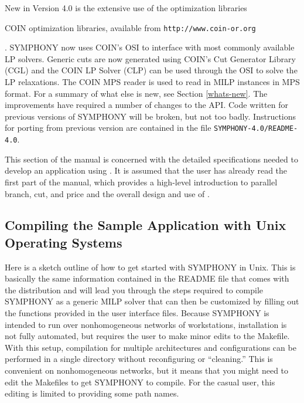 New in Version 4.0 is the extensive use of the
\emph{}
optimization libraries 
\begin{latexonly} 
COIN optimization libraries,
available from \texttt{http://www.coin-or.org} 
\end{latexonly}.
SYMPHONY now uses COIN's OSI to interface with most commonly available LP
solvers. Generic cuts are now generated using COIN's Cut Generator Library
(CGL) and the COIN LP Solver (CLP) can be used through the OSI to solve the LP
relaxations. The COIN MPS reader is used to read in MILP instances in MPS
format. For a summary of what else is new, see Section \ref{whats-new}. The
improvements have required a number of changes to the API. Code written for
previous versions of SYMPHONY will be broken, but not too badly. Instructions
for porting from previous version are contained in the file
\texttt{SYMPHONY-4.0/README-4.0}.

This section of the manual is concerned with the detailed
specifications needed to develop an application using \BB. It is
assumed that the user has already read the first part of the manual, which
provides a high-level introduction to parallel branch, cut, and price
and the overall design and use of \BB. 


\subsection{Compiling the Sample Application with Unix Operating Systems}
\label{getting_started_unix}

Here is a sketch outline of how to get started with SYMPHONY in Unix. This is
basically the same information contained in the README file that comes with
the distribution and will lead you through the steps required to compile
SYMPHONY as a generic MILP solver that can then be customized by filling out
the functions provided in the user interface files. Because SYMPHONY is
intended to run over nonhomogeneous networks of workstations, installation is
not fully automated, but requires the user to make minor edits to the
Makefile.  With this setup, compilation for multiple architectures and
configurations can be performed in a single directory without reconfiguring or
``cleaning.'' This is convenient on nonhomogeneous networks, but it means that
you might need to edit the Makefiles to get SYMPHONY to compile. For the casual
user, this editing is limited to providing some path names.

